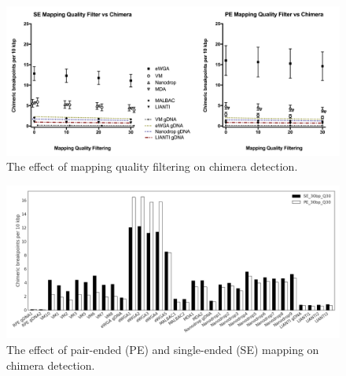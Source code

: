\begin{figure}
\centering
\includegraphics[keepaspectratio,width=\textwidth]{./figures/MappingQvsChimera}
\caption[The effect of mapping quality filtering on chimera detection.]{The effect of mapping quality filtering on chimera detection.}
\label{fig:chimeraMappingQAll}
\end{figure}

\begin{figure}
\centering
\includegraphics[keepaspectratio,width=1\textwidth]{./figures/20170517_ChimericBreakpoint10kbp_SEvsPE_Q30}
\caption[The effect of pair-ended and single-ended mapping on chimera detection]{The effect of pair-ended (PE) and single-ended (SE) mapping on chimera detection.}
\label{fig:chimeraPEvsSE}
\end{figure}

